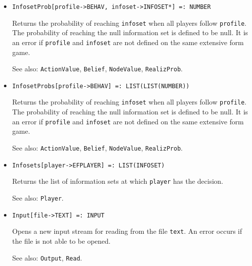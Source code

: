 \begin{itemize}
\item{}
\protect \large \begin{verbatim}
InfosetProb[profile->BEHAV, infoset->INFOSET*] =: NUMBER 
\end{verbatim}\normalsize

\bd
Returns the probability of reaching \verb+infoset+ when all players
follow \verb+profile+.  The probability of reaching the null information
set is defined to be null.  It is an error if \verb+profile+ and
\verb+infoset+ are not defined on the same extensive form game.
\item
[See also:] \verb+ActionValue+, \verb+Belief+, \verb+NodeValue+,
\verb+RealizProb+.
\ed

\item{}
\protect \large \begin{verbatim}
InfosetProbs[profile->BEHAV] =: LIST(LIST(NUMBER)) 
\end{verbatim}\normalsize

\bd
Returns the probability of reaching \verb+infoset+ when all players
follow \verb+profile+.  The probability of reaching the null information
set is defined to be null.  It is an error if \verb+profile+ and
\verb+infoset+ are not defined on the same extensive form game.
\item
[See also:] \verb+ActionValue+, \verb+Belief+, \verb+NodeValue+,
\verb+RealizProb+.
\ed

\item{}
\protect \large \begin{verbatim}
Infosets[player->EFPLAYER] =: LIST(INFOSET) 
\end{verbatim}\normalsize

\bd
Returns the list of information sets at which 
\verb+player+ has the decision.
\item [See also:] \verb+Player+.
\ed

\item{}
\protect \large \begin{verbatim}
Input[file->TEXT] =: INPUT 
\end{verbatim}\normalsize

\bd
Opens a new input stream for reading from the file \verb+text+.  An
error occurs if the file is not able to be opened.
\item
[See also:]  \verb+Output+, \verb+Read+.
\ed



\end{itemize}
